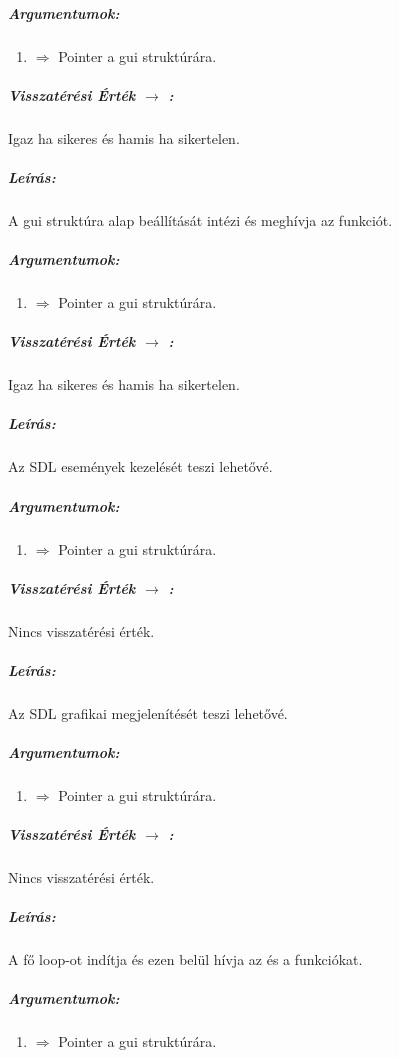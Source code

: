 \documentclass{article}
\begin{document}
\subparagraph{Argumentumok:}
\begin{enumerate}
    \item {} \(\Rightarrow\) Pointer a gui struktúrára.
\end{enumerate}

\subparagraph{Visszatérési Érték \(\rightarrow\) :}
Igaz ha sikeres és hamis ha sikertelen.
\chline


\subparagraph{Leírás:}
A gui struktúra alap beállítását intézi és meghívja az 
 funkciót.

\subparagraph{Argumentumok:}
\begin{enumerate}
    \item {} \(\Rightarrow\) Pointer a gui struktúrára.
\end{enumerate}

\subparagraph{Visszatérési Érték \(\rightarrow\) :}
Igaz ha sikeres és hamis ha sikertelen.
\chline


\subparagraph{Leírás:}
Az SDL események kezelését teszi lehetővé.

\subparagraph{Argumentumok:}
\begin{enumerate}
    \item {} \(\Rightarrow\) Pointer a gui struktúrára.
\end{enumerate}

\subparagraph{Visszatérési Érték \(\rightarrow\) :}
Nincs visszatérési érték.
\chline


\subparagraph{Leírás:}
Az SDL grafikai megjelenítését teszi lehetővé.

\subparagraph{Argumentumok:}
\begin{enumerate}
    \item {} \(\Rightarrow\) Pointer a gui struktúrára.
\end{enumerate}

\subparagraph{Visszatérési Érték \(\rightarrow\) :}
Nincs visszatérési érték.
\chline


\subparagraph{Leírás:}
A fő loop-ot indítja és ezen belül hívja az 
és a  funkciókat.

\subparagraph{Argumentumok:}
\begin{enumerate}
    \item {} \(\Rightarrow\) Pointer a gui struktúrára.
\end{enumerate}
\end{document}

